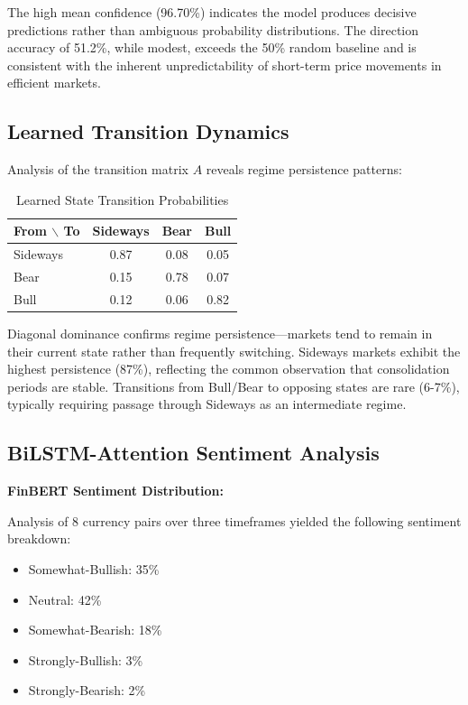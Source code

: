 \documentclass[conference]{IEEEtran}
\begin{document}
The high mean confidence (96.70\%) indicates the model produces decisive predictions rather than ambiguous probability distributions. The direction accuracy of 51.2\%, while modest, exceeds the 50\% random baseline and is consistent with the inherent unpredictability of short-term price movements in efficient markets.

\subsection{Learned Transition Dynamics}

Analysis of the transition matrix $A$ reveals regime persistence patterns:

\begin{table}[htbp]
\centering
\caption{Learned State Transition Probabilities}
\label{tab:transitions}
\begin{tabular}{lccc}
\toprule
\textbf{From $\backslash$ To} & \textbf{Sideways} & \textbf{Bear} & \textbf{Bull} \\
\midrule
Sideways & 0.87 & 0.08 & 0.05 \\
Bear & 0.15 & 0.78 & 0.07 \\
Bull & 0.12 & 0.06 & 0.82 \\
\bottomrule
\end{tabular}
\end{table}

Diagonal dominance confirms regime persistence—markets tend to remain in their current state rather than frequently switching. Sideways markets exhibit the highest persistence (87\%), reflecting the common observation that consolidation periods are stable. Transitions from Bull/Bear to opposing states are rare (6-7\%), typically requiring passage through Sideways as an intermediate regime.

\subsection{BiLSTM-Attention Sentiment Analysis}

\textbf{FinBERT Sentiment Distribution:}

Analysis of 8 currency pairs over three timeframes yielded the following sentiment breakdown:
\begin{itemize}
\item Somewhat-Bullish: 35\%
\item Neutral: 42\%
\item Somewhat-Bearish: 18\%
\item Strongly-Bullish: 3\%
\item Strongly-Bearish: 2\%
\end{itemize}
\end{document}
